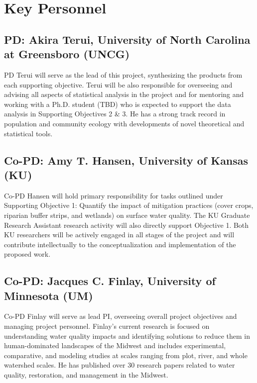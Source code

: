 \documentclass[12pt, class=article, crop=false]{standalone}
\begin{document}
\section*{Key Personnel}

\subsection*{PD: Akira Terui, University of North Carolina at Greensboro (UNCG)}
PD Terui will serve as the lead of this project, synthesizing the products from each supporting objective.
Terui will be also responsible for overseeing and advising all aspects of statistical analysis in the project and for mentoring and working with a Ph.D. student (TBD) who is expected to support the data analysis in Supporting Objectives 2 \& 3. He has a strong track record in population and community ecology with developments of novel theoretical and statistical tools.

\subsection*{Co-PD: Amy T. Hansen, University of Kansas (KU)}
Co-PD Hansen will hold primary responsibility for tasks outlined under Supporting Objective 1: Quantify the impact of mitigation practices (cover crops, riparian buffer strips, and wetlands) on surface water quality.
The KU Graduate Research Assistant research activity will also directly support Objective 1.
Both KU researchers will be actively engaged in all stages of the project and will contribute intellectually to the conceptualization and implementation of the proposed work.

\subsection*{Co-PD: Jacques C. Finlay, University of Minnesota (UM)}
Co-PD Finlay will serve as lead PI, overseeing overall project objectives and managing project personnel.
Finlay's current research is focused on understanding water quality impacts and identifying solutions to reduce them in human-dominated landscapes of the Midwest and includes experimental, comparative, and modeling studies at scales ranging from plot, river, and whole watershed scales.
He has published over 30 research papers related to water quality, restoration, and management in the Midwest.
\end{document}
